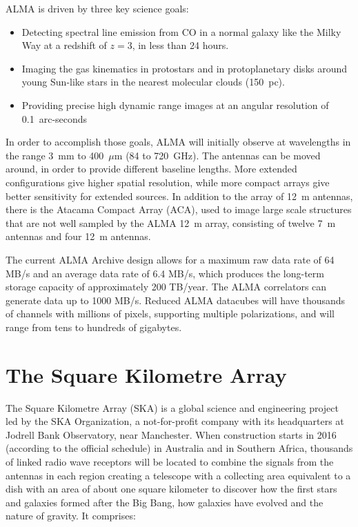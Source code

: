 ALMA is driven by three key science goals:

\begin{itemize}

\item Detecting spectral line emission from CO in a normal galaxy like the Milky Way at a redshift of $z=3$, in less than 24 hours.

\item Imaging the gas kinematics in protostars and in protoplanetary disks around young Sun-like stars in the nearest molecular clouds
(150~pc).

\item Providing precise high dynamic range images at an angular resolution of
0.1~arc-seconds
\end{itemize}

In order to accomplish those goals,
ALMA will initially 
observe at wavelengths in the range 3~mm to
400~$\mu{}$m
(84 to 720~GHz). The antennas can be moved around, in order to
provide different %
baseline lengths. More extended
configurations %
give
higher %
spatial resolution,
while
more compact arrays give better sensitivity for extended sources. In addition to the array of
12~m
antennas, there is the Atacama Compact Array (ACA), used to image large scale structures that are not well sampled by the ALMA
12~m
array, consisting of twelve
7~m
antennas and four
12~m
antennas. 


The current ALMA Archive design allows for a maximum
raw
data rate of 64 MB/s and an average data rate
of 6.4 MB/s, which produces the long-term storage capacity of approximately 200 TB/year. The
ALMA correlators can
generate %
data
up to 1000 MB/s. 
Reduced ALMA datacubes will have thousands of channels with millions of pixels, supporting multiple polarizations, and will range from tens to hundreds of gigabytes.

\section{The Square Kilometre Array} %
\label{sec:the_square_kilometre_array}
The Square
Kilometre %
Array (SKA) %
is a global science and engineering project led by the SKA Organization, a not-for-profit company with its headquarters at Jodrell Bank Observatory, near Manchester. When construction starts in 2016 (according to
the official schedule) %
in Australia and in Southern Africa, thousands of linked radio wave receptors will be located to combine the signals from the antennas in each region creating a telescope with a collecting area equivalent to a dish with an area of about one square kilometer to discover how the first stars and galaxies formed after the Big Bang, how galaxies have evolved and the nature of gravity. It comprises:

